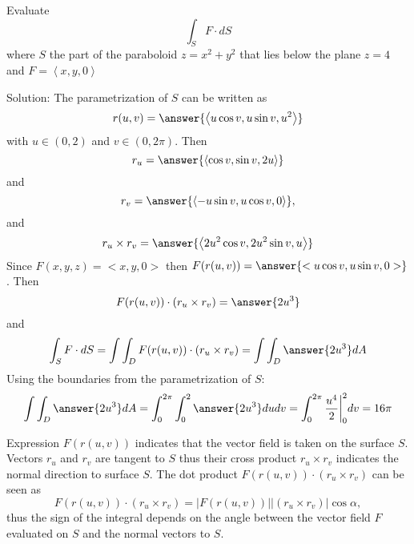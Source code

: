 \documentclass{ximera}
\begin{document}
\begin{problem}
Evaluate 
\[
\int_{S}F\cdot dS
\]
where $S$ the part of the paraboloid $z=x^2+y^2$ that lies below the plane $z=4$ and $F=\left<x,y,0\right>$

Solution: 
The parametrization of $S$ can be written as 
\[
r(u,v)=\answer{\left<u\cos v,u \sin v,u^2\right>}
\]
with $u\in(0,2) $ and $v\in (0,2\pi)$. Then 
\[
r_u=\answer{\left<\cos v,\sin v,2u\right>}
\]
and 
\[
r_v=\answer{\left<-u \sin v,u\cos v,0\right>},
\]
and
\[
r_u\times r_v=\answer{\left<2u^2\cos v ,2u^2\sin v ,u \right>}
\]
Since $F(x,y,z)=<x,y,0>$ then $F(r(u,v))=\answer{<u\cos v,u \sin v,0>}$. Then
\[
F(r(u,v))\cdot (r_u\times r_v)=\answer{2u^3}
\]
and 
\[
\int_{S}F\cdot dS=\int\int_{D}F(r(u,v))\cdot (r_u\times r_v)=\int\int_{D}\answer{2u^3}dA
\]
Using the boundaries from the parametrization of $S$:
\[
\int\int_{D}\answer{2u^3}dA=\int^{2 \pi}_{0}\int^{2}_{0}\answer{2u^3}dudv=\int^{2\pi}_{0}\frac{u^4}{2}\bigg{|}^{2}_{0}dv=16\pi
\]
\end{problem}
Expression $F(r(u,v))$ indicates that the vector field is taken on the surface $S$. Vectors $r_u$ and $r_v $ are tangent to $S$ thus their cross product $r_u\times r_v$ indicates the normal direction to surface $S$. The dot product $F(r(u,v))\cdot (r_u\times r_v)$ can be seen as 
\[
F(r(u,v))\cdot (r_u\times r_v)=|F(r(u,v))| |(r_u\times r_v)|\cos\alpha,
\]
thus the sign of the integral depends on the angle between the vector field $F$ evaluated on $S$ and the normal vectors to $S$. 
\end{document}
